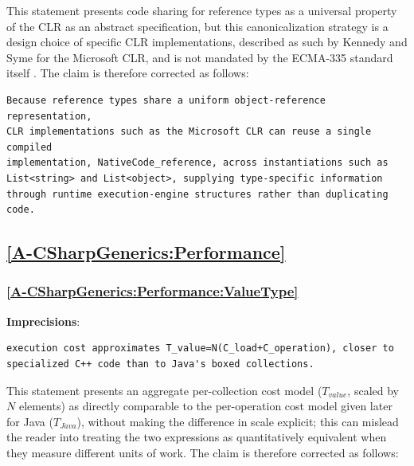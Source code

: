 \documentclass[11pt]{report}
\begin{document}
This statement presents code sharing for reference types as a universal
property of the CLR as an abstract specification, but this canonicalization
strategy is a design choice of specific CLR implementations, described as
such by Kennedy and Syme \cite{kennedy2001} for the Microsoft CLR, and is
not mandated by the ECMA-335 standard itself \cite{ecma335_2024}. The claim
is therefore corrected as follows:

\begin{Verbatim}[breaklines=true]
Because reference types share a uniform object-reference representation,
CLR implementations such as the Microsoft CLR can reuse a single compiled
implementation, NativeCode_reference, across instantiations such as
List<string> and List<object>, supplying type-specific information
through runtime execution-engine structures rather than duplicating code.
\end{Verbatim}

\subsection*{\hyperref[A-CSharpGenerics:Performance]{\ref*{A-CSharpGenerics:Performance} }}

\subsubsection*{\hyperref[A-CSharpGenerics:Performance:ValueType]{\ref*{A-CSharpGenerics:Performance:ValueType} }}

\noindent\textbf{Imprecisions}:

\begin{Verbatim}[breaklines=true]
execution cost approximates T_value=N(C_load+C_operation), closer to
specialized C++ code than to Java's boxed collections.
\end{Verbatim}

This statement presents an aggregate per-collection cost model
($T_{value}$, scaled by $N$ elements) as directly comparable to the
per-operation cost model given later for Java ($T_{Java}$), without making
the difference in scale explicit; this can mislead the reader into treating
the two expressions as quantitatively equivalent when they measure
different units of work. The claim is therefore corrected as follows:
\end{document}
